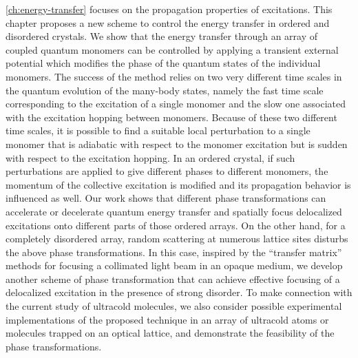 \autoref{ch:energy-transfer} focuses on the propagation properties of excitations. This chapter proposes a new scheme to control the 
energy transfer in ordered and disordered crystals. 
We 
show that the energy transfer through an array of coupled quantum monomers can be controlled by applying a 
transient external potential which modifies the phase of the quantum states of the individual monomers. The success of the 
method relies 
on two very different time scales in the quantum evolution of the many-body states, namely the fast time scale 
corresponding to the excitation of a single monomer and the slow one associated with the excitation hopping between 
monomers.  Because of these two different time scales,  it is possible to find a suitable
local perturbation to a single monomer that is adiabatic with respect to the monomer excitation but is sudden
with respect to the excitation hopping. 
 In an ordered crystal, if such perturbations are applied to give different phases to 
different monomers, the momentum of the collective excitation is modified and its propagation behavior is influenced
as well. Our work shows that different phase transformations can accelerate or decelerate quantum energy transfer and 
spatially focus delocalized excitations onto different parts of those ordered arrays. On the other hand, for a completely disordered array,  random scattering at numerous lattice sites disturbs the above phase transformations. In this case,  inspired by the ``transfer matrix'' methods for focusing  a 
collimated light beam in an opaque medium\cite{opaque-1, Gigan-TMeasure-PRL10, Mosk-NPhot10, Cizmar-NPhot10, 
Silberberg-11, Chatel-Focusing-11, Lagendijk-Focusing-11, zhenia-11, cui-11, kim-11},
we develop another scheme of phase transformation that 
can achieve effective focusing of a delocalized excitation in the presence of strong disorder. To make connection with the current study of  
ultracold molecules,  we also consider possible experimental implementations of the proposed technique in an array of 
ultracold atoms or molecules trapped on an optical lattice, and demonstrate the feasibility of the phase transformations. 

